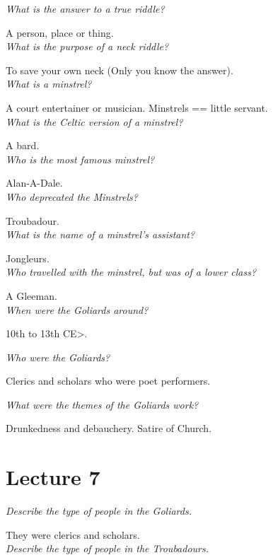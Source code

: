 \documentclass[12pt]{article}
\begin{document}
\textit{What is the answer to a true riddle?}

A person, place or thing.\\

\textit{What is the purpose of a neck riddle?}

To save your own neck (Only you know the answer).\\

\textit{What is a minstrel?}

A court entertainer or musician. Minstrels == little servant.\\

\textit{What is the Celtic version of a minstrel?}

A bard.\\ 

\textit{Who is the most famous minstrel?}

Alan-A-Dale.\\

\textit{Who deprecated the Minstrels?}

Troubadour.\\

\textit{What is the name of a minstrel's assistant?}

Jongleurs.\\


\textit{Who travelled with the minstrel, but was of a lower class?}

A Gleeman.\\

\textit{When were the Goliards around?}

10th to 13th CE>.

\textit{Who were the Goliards?}

Clerics and scholars who were poet performers.

\textit{What were the themes of the Goliards work?}

Drunkedness and debauchery. Satire of Church.\\

\section*{Lecture 7}

\textit{Describe the type of people in the Goliards.}

They were clerics and scholars.\\

\textit{Describe the type of people in the Troubadours.}
\end{document}
